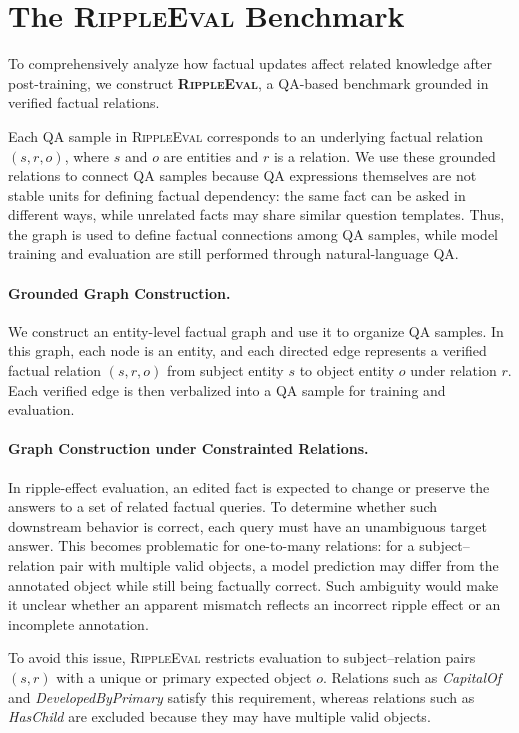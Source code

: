 

\section{The \textsc{RippleEval} Benchmark}
\label{sec:dataset}


To comprehensively analyze how factual updates affect related knowledge after post-training, we construct \textbf{\textsc{RippleEval}}, a QA-based benchmark grounded in verified factual relations. 

Each QA sample in \textsc{RippleEval} corresponds to an underlying factual relation $(s,r,o)$, where $s$ and $o$ are entities and $r$ is a relation. We use these grounded relations to connect QA samples because QA expressions themselves are not stable units for defining factual dependency: the same fact can be asked in different ways, while unrelated facts may share similar question templates. Thus, the graph is used to define factual connections among QA samples, while model training and evaluation are still performed through natural-language QA.

\paragraph{Grounded Graph Construction.}
We construct an entity-level factual graph and use it to organize QA samples. In this graph, each node is an entity, and each directed edge represents a verified factual relation $(s,r,o)$ from subject entity $s$ to object entity $o$ under relation $r$. Each verified edge is then verbalized into a QA sample for training and evaluation.

\paragraph{Graph Construction under Constrainted Relations.}
In ripple-effect evaluation, an edited fact is expected to change or preserve the answers to a set of related factual queries. To determine whether such downstream behavior is correct, each query must have an unambiguous target answer. This becomes problematic for one-to-many relations: for a subject--relation pair with multiple valid objects, a model prediction may differ from the annotated object while still being factually correct. Such ambiguity would make it unclear whether an apparent mismatch reflects an incorrect ripple effect or an incomplete annotation.

To avoid this issue, \textsc{RippleEval} restricts evaluation to subject--relation pairs $(s,r)$ with a unique or primary expected object $o$. Relations such as \textit{CapitalOf} and \textit{DevelopedByPrimary} satisfy this requirement, whereas relations such as \textit{HasChild} are excluded because they may have multiple valid objects. 

